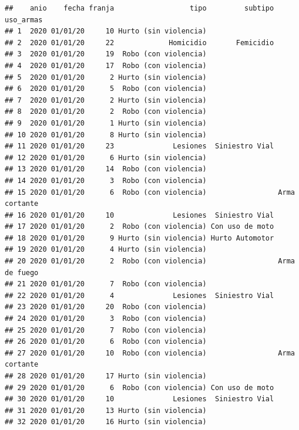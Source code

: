 \documentclass[
]{book}
\begin{document}
\begin{verbatim}
##    anio    fecha franja                  tipo         subtipo     uso_armas
## 1  2020 01/01/20     10 Hurto (sin violencia)                              
## 2  2020 01/01/20     22             Homicidio       Femicidio              
## 3  2020 01/01/20     19  Robo (con violencia)                              
## 4  2020 01/01/20     17  Robo (con violencia)                              
## 5  2020 01/01/20      2 Hurto (sin violencia)                              
## 6  2020 01/01/20      5  Robo (con violencia)                              
## 7  2020 01/01/20      2 Hurto (sin violencia)                              
## 8  2020 01/01/20      2  Robo (con violencia)                              
## 9  2020 01/01/20      1 Hurto (sin violencia)                              
## 10 2020 01/01/20      8 Hurto (sin violencia)                              
## 11 2020 01/01/20     23              Lesiones  Siniestro Vial              
## 12 2020 01/01/20      6 Hurto (sin violencia)                              
## 13 2020 01/01/20     14  Robo (con violencia)                              
## 14 2020 01/01/20      3  Robo (con violencia)                              
## 15 2020 01/01/20      6  Robo (con violencia)                 Arma cortante
## 16 2020 01/01/20     10              Lesiones  Siniestro Vial              
## 17 2020 01/01/20      2  Robo (con violencia) Con uso de moto              
## 18 2020 01/01/20      9 Hurto (sin violencia) Hurto Automotor              
## 19 2020 01/01/20      4 Hurto (sin violencia)                              
## 20 2020 01/01/20      2  Robo (con violencia)                 Arma de fuego
## 21 2020 01/01/20      7  Robo (con violencia)                              
## 22 2020 01/01/20      4              Lesiones  Siniestro Vial              
## 23 2020 01/01/20     20  Robo (con violencia)                              
## 24 2020 01/01/20      3  Robo (con violencia)                              
## 25 2020 01/01/20      7  Robo (con violencia)                              
## 26 2020 01/01/20      6  Robo (con violencia)                              
## 27 2020 01/01/20     10  Robo (con violencia)                 Arma cortante
## 28 2020 01/01/20     17 Hurto (sin violencia)                              
## 29 2020 01/01/20      6  Robo (con violencia) Con uso de moto              
## 30 2020 01/01/20     10              Lesiones  Siniestro Vial              
## 31 2020 01/01/20     13 Hurto (sin violencia)                              
## 32 2020 01/01/20     16 Hurto (sin violencia)                              

\end{verbatim}
\end{document}
